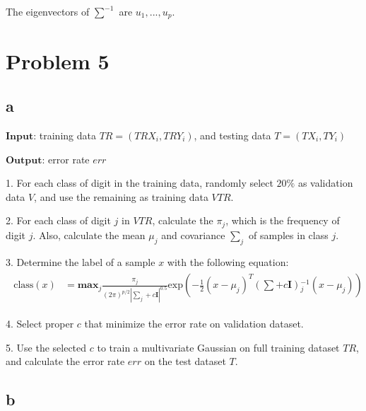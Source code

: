\documentclass[a4paper,11pt]{article}
\theoremstyle{mytheor}
\begin{document}
The eigenvectors of $\sum^{-1}$ are $u_1, ..., u_p$.

\section*{Problem 5}
\subsection*{a}

$\mathbf{Input}$: training data $TR = (TRX_i, TRY_i)$, and testing data $T = (TX_i, TY_i)$

$\mathbf{Output}$: error rate $err$

1. For each class of digit in the training data, randomly select $20\%$ as validation data $V$, and use the remaining as training data $VTR$.

2. For each class of digit $j$ in $VTR$, calculate the $\pi_j$, which is the frequency of digit $j$. Also, calculate the mean $\mu_j$ and covariance $\sum_{j}$ of samples in class $j$.

3. Determine the label of a sample $x$ with the following equation:
\begin{align}
	\begin{split}
	\text{class}(x) &= \mathbf{max}_{j} \frac{\pi_j}{(2\pi)^{p/2} |\sum_j + c\mathbf{I}|^{0.5}}
	\text{exp}(-\frac{1}{2} (x - \mu_j)^T (\sum + c\mathbf{I})  {}_j^{-1} (x - \mu_j))
	\end{split}
\end{align}

4. Select proper $c$ that minimize the error rate on validation dataset.

5. Use the selected $c$ to train a multivariate Gaussian on full training dataset $TR$, and calculate the error rate $err$ on the test dataset $T$.

\subsection*{b}
\end{document}
